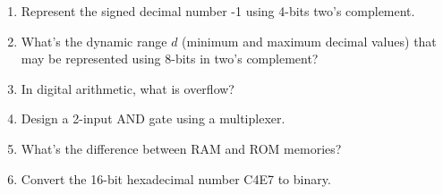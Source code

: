 \documentclass[]{exam}
\newif\ifanswers
\begin{document}
\begin{enumerate}
\item Represent the signed decimal number -1 using 4-bits two's complement. 
\ifanswers\\
\alertred{13/19}\\
\code{1111}
\fi

\item What's the dynamic range $d$ (minimum and maximum decimal values) that may be represented using 8-bits in two's complement?
\ifanswers\\
\alertred{3/14}\\
\begin{center}
$ d \in [-2^{n-1}, 2^{n-1}-1]$\\
$ d \in [-2^{7}, 2^{7}-1]$\\
$ d \in [-128,127]$\\
\end{center}
\fi

\item In digital arithmetic, what is overflow?
\ifanswers\\
\alertred{16/17}\\
Overflow occurs when the result of an arithmetic operation can not be represented with the available numbers of bits.
\fi

\item Design a 2-input AND gate using a multiplexer.
\ifanswers
\alertred{4/11}\\
\begin{figure}[!h]
\centering
\texttt{[image: AND2\_MUX]}
\label{Figure:AND2_MUX}
\caption{AND2 gate from MUX.}
\end{figure}
\fi

\item What's the difference between RAM and ROM memories?
\ifanswers\\
\alertred{18/20}\\
RAMs are read/write volatile memories. Once their power supply is switched off, their will lose their contents. By contrast, ROMs are read-only non-volatile memories, \ie, their contents will remain even after switching their power supply off.
\fi

\item Convert the 16-bit hexadecimal number C4E7 to binary.
\ifanswers\\
\alertred{15/20}\\
\code{1100 0100 1110 0111}
\fi


\end{enumerate}
\end{document}
